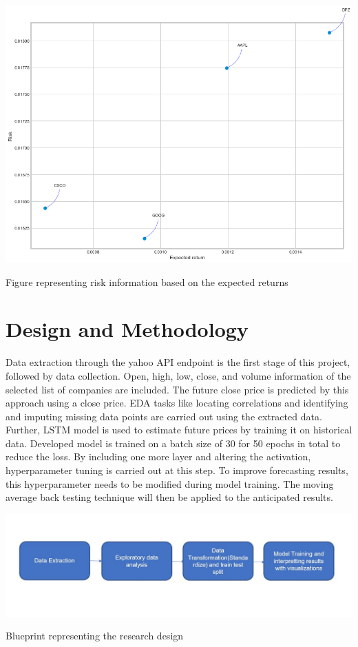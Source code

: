 \begin{center}
    \includegraphics[scale=0.40]{risk_plot.png}
    \caption{ Figure representing risk information based on the expected returns}
\end{center}

\section{Design and Methodology}

Data extraction through the yahoo API endpoint is the first stage of this project, followed by data collection. Open, high, low, close, and volume information of the selected list of companies are included. The future close price is predicted by this approach using a close price. EDA tasks like locating correlations and identifying and imputing missing data points are carried out using the extracted data. Further, LSTM model is used to estimate future prices by training it on historical data. Developed model is trained on a batch size of 30 for 50 epochs in total to reduce the loss. By including one more layer and altering the activation, hyperparameter tuning is carried out at this step. To improve forecasting results, this hyperparameter needs to be modified during model training. The moving average back testing technique will then be applied to the anticipated results.

\begin{center}
    \includegraphics[width=\textwidth]{methodology.JPG}
    \caption{Blueprint representing the research design}
\end{center}


